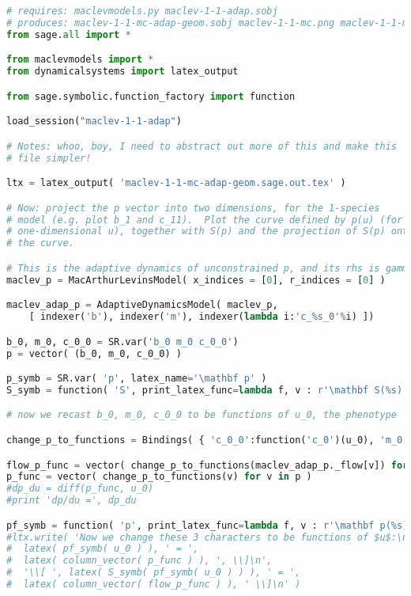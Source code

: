 \begin{lstlisting}[language=Python]
# requires: maclevmodels.py maclev-1-1-adap.sobj
# produces: maclev-1-1-mc-adap-geom.sobj maclev-1-1-mc.png maclev-1-1-mc-adap-geom.sage.out.tex
from sage.all import *

from maclevmodels import *
from dynamicalsystems import latex_output

from sage.symbolic.function_factory import function

load_session("maclev-1-1-adap")

# Notes: whoo, boy, I need to abstract out more of this and make this
# file simpler!

ltx = latex_output( 'maclev-1-1-mc-adap-geom.sage.out.tex' )

# Now: project the p vector into two dimensions, for the 1-species
# model (e.g. plot b_1 and c_11).  Plot the curve defined by p(u) (for
# one-dimensional u), together with S(p) and the projection of S(p) onto
# the curve.

# This is the adaptive dynamics of unconstrained p, and its rhs is gamma X S(p)
maclev_p = MacArthurLevinsModel( x_indices = [0], r_indices = [0] )

maclev_adap_p = AdaptiveDynamicsModel( maclev_p,
    [ indexer('b'), indexer('m'), indexer(lambda i:'c_%s_0'%i) ])

b_0, m_0, c_0_0 = SR.var('b_0 m_0 c_0_0')
p = vector( (b_0, m_0, c_0_0) )

p_symb = SR.var( 'p', latex_name='\mathbf p' )
S_symb = function( 'S', print_latex_func=lambda f, v : r'\mathbf S(%s)' % latex(v) )

# now we recast b_0, m_0, c_0_0 to be functions of u_0, the phenotype

change_p_to_functions = Bindings( { 'c_0_0':function('c_0')(u_0), 'm_0':function('m')(u_0), 'b_0':function('b')(u_0) } )

flow_p_func = vector( change_p_to_functions(maclev_adap_p._flow[v]) for v in p )
p_func = vector( change_p_to_functions(v) for v in p )
#dp_du = diff(p_func, u_0)
#print 'dp/du =', dp_du

pf_symb = function( 'p', print_latex_func=lambda f, v : r'\mathbf p(%s)' % latex(v) )
#ltx.write( 'Now we change these 3 characters to be functions of $u$:\n\\[ ',
#  latex( pf_symb( u_0 ) ), ' = ',
#  latex( column_vector( p_func ) ), ', \\]\n',
#  '\\[ ', latex( S_symb( pf_symb( u_0 ) ) ), ' = ',
#  latex( column_vector( flow_p_func ) ), ' \\]\n' )


\end{lstlisting}
